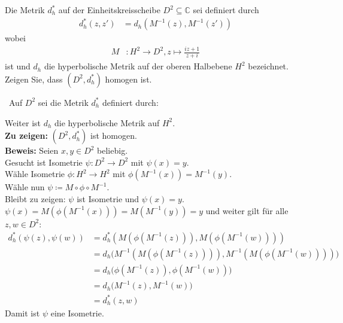 \begin{assignment}
  Die Metrik \( d_h^\ast \) auf der Einheitskreisscheibe \( D^2 \subseteq \mathbb{C} \) sei definiert durch 
  \begin{align*}
    d_h^\ast (z, z') &= d_h(M^{-1}(z),M^{-1}(z')) 
  \end{align*}
  wobei
  \begin{align*} 
    M &: H^2 \to D^2, z \mapsto \frac{iz + 1}{z + i}
  \end{align*}
  ist und \( d_h \) die hyperbolische Metrik auf der oberen Halbebene \( H^2 \) bezeichnet. \\
  Zeigen Sie, dass \( (D^2, d_h^\ast)\) homogen ist.
\end{assignment}
\begin{solution}
  \
  Auf \( D^2 \) sei die Metrik \( d_h^\ast \) definiert durch:
  
  Weiter ist \( d_h \) die hyperbolische Metrik auf \( H^2 \). \\
  \textbf{Zu zeigen:} \( (D^2, d_h^\ast) \) ist homogen. \\
  \textbf{Beweis:} Seien \( x,y \in D^2 \) beliebig. \\
  Gesucht ist Isometrie \( \psi: D^2 \to D^2 \) mit \( \psi(x) = y \). \\
  Wähle Isometrie \( \phi: H^2 \to H^2 \) mit \( \phi(M^{-1}(x)) = M^{-1}(y) \). \\
  Wähle nun \( \psi \coloneqq M \circ \phi \circ M^{-1} \). \\
  Bleibt zu zeigen: \( \psi \) ist Isometrie und \( \psi(x) = y \). \\
  \( \psi(x) = M(\phi(M^{-1}(x))) = M(M^{-1}(y)) = y \) und weiter gilt für alle \( z, w \in D^2 \):
  \begin{align*}
    d_h^\ast(\psi(z), \psi(w)) &= d_h^\ast (M(\phi(M^{-1}(z))), M(\phi(M^{-1}(w)))) \\
    &= d_h \big(M^{-1}(M(\phi(M^{-1}(z)))), M^{-1}(M(\phi(M^{-1}(w))))\big) \\
    &= d_h \big(\phi(M^{-1}(z)), \phi(M^{-1}(w))\big) \\
    &= d_h \big(M^{-1}(z), M^{-1}(w)) \\
    &= d_h^\ast (z, w)
  \end{align*}
  Damit ist \( \psi \) eine Isometrie.
  
\end{solution}























